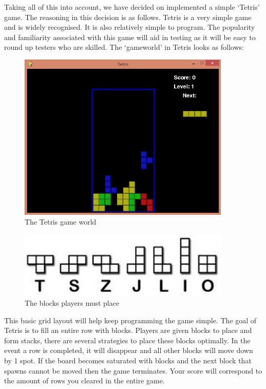 \documentclass[11pt]{article}
\begin{document}
Taking all of this into account, we have decided on implemented a simple `Tetris' game. The reasoning in this decision is as follows. Tetris is a very simple game and is widely recognised. It is also relatively simple to program. The popularity and familiarity associated with this game will aid in testing as it will be easy to round up testers who are skilled.
\vspace{3.0 mm}
The `gameworld' in Tetris looks as follows:
\FloatBarrier
\begin{figure}[!h]
	\centering
    \includegraphics[width=0.9\textwidth]{board.jpg}
	\caption{The Tetris game world}
	\label{Figure 1}

\end{figure}
\FloatBarrier
\begin{figure}[!h]
	\centering
    \includegraphics[width=0.9\textwidth]{blocks.jpg}
	\caption{The blocks players must place}
	\label{Figure 2}

\end{figure}
\FloatBarrier
This basic grid layout will help keep programming the game simple. The goal of Tetris is to fill an entire row with blocks. Players are given blocks to place and form stacks, there are several strategies to place these blocks optimally. In the event a row is completed, it will disappear and all other blocks will move down by 1 spot. If the board becomes saturated with blocks and the next block that spawns cannot be moved then the game terminates. Your score will correspond to the amount of rows you cleared in the entire game.
\end{document}
